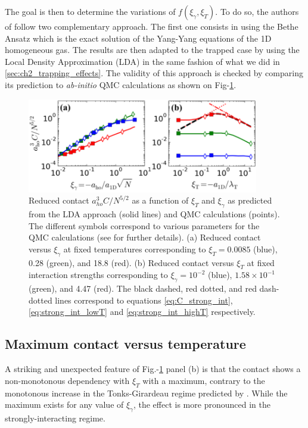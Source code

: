 The goal is then to determine the variations of $f(\xi_{\gamma},\xi_{T})$. To do so, the authors of \cite{yao2018tan} follow two complementary approach. The first one consists in using the Bethe Ansatz which is the exact solution of the Yang-Yang equations \cite{yang1969thermodynamics} of the 1D homogeneous gas. The results are then adapted to the trapped case by using the Local Density Approximation (LDA) in the same fashion of what we did in \ref{sec:ch2_trapping_effects}. The validity of this approach is checked by comparing its prediction to {\it ab-initio} QMC calculations as shown on Fig-\ref{fig:C_theo}.

\begin{figure}
    \centering
    \includegraphics[width=0.9\textwidth]{Fig/Chapter5/BS_LDA_vs_Bethe.PNG}
    \caption[Reduced contact $a_{ho}^3 C / N^{5/2}$ as a function of $\xi_T$ and $\xi_{\gamma}$ as predicted from the LDA approach and QMC calculations]{Reduced contact $a_{ho}^3 C / N^{5/2}$ as a function of $\xi_T$ and $\xi_{\gamma}$ as predicted from the LDA approach (solid lines) and QMC calculations (points). The different symbols correspond to various parameters for the QMC calculations (see \cite{yao2018tan} for further details). (a) Reduced contact versus $\xi_{\gamma}$ at fixed temperatures corresponding to $\xi_T = 0.0085$ (blue), 0.28 (green), and 18.8 (red). (b) Reduced contact versus $\xi_T$  at fixed interaction strengths corresponding to $\xi_\gamma = 10^{-2}$ (blue), $1.58 \times 10^{-1}$ (green), and 4.47 (red). The black dashed, red dotted, and red dash-dotted lines correspond to equations \ref{eq:C_strong_int}, \ref{eq:strong_int_lowT} and \ref{eq:strong_int_highT} respectively.}
    \label{fig:C_theo}
\end{figure}

\subsection{Maximum contact versus temperature}

A striking and unexpected feature of Fig.-\ref{fig:C_theo} panel (b) is that the contact shows a non-monotonous dependency with $\xi_T$ with a maximum, contrary to the monotonous increase in the Tonks-Girardeau regime predicted by \cite{vignolo2013universal}. While the maximum exists for any value of $\xi_{\gamma}$, the effect is more pronounced in the strongly-interacting regime. 

